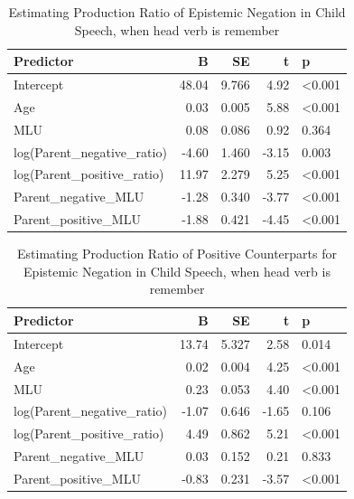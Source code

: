 \documentclass[
  english,
  man,floatsintext]{apa6}
\begin{document}
\begin{table}

\caption{\label{tab:unnamed-chunk-8}Estimating Production Ratio of Epistemic Negation in Child Speech, when head verb is remember}
\centering
\begin{tabular}[t]{l|r|r|r|l}
\hline
Predictor & B & SE & t & p\\
\hline
Intercept & 48.04 & 9.766 & 4.92 & <0.001\\
\hline
Age & 0.03 & 0.005 & 5.88 & <0.001\\
\hline
MLU & 0.08 & 0.086 & 0.92 & 0.364\\
\hline
log(Parent\_negative\_ratio) & -4.60 & 1.460 & -3.15 & 0.003\\
\hline
log(Parent\_positive\_ratio) & 11.97 & 2.279 & 5.25 & <0.001\\
\hline
Parent\_negative\_MLU & -1.28 & 0.340 & -3.77 & <0.001\\
\hline
Parent\_positive\_MLU & -1.88 & 0.421 & -4.45 & <0.001\\
\hline
\end{tabular}
\end{table}

\begin{table}

\caption{\label{tab:unnamed-chunk-8}Estimating Production Ratio of Positive Counterparts for Epistemic Negation in Child Speech, when head verb is remember}
\centering
\begin{tabular}[t]{l|r|r|r|l}
\hline
Predictor & B & SE & t & p\\
\hline
Intercept & 13.74 & 5.327 & 2.58 & 0.014\\
\hline
Age & 0.02 & 0.004 & 4.25 & <0.001\\
\hline
MLU & 0.23 & 0.053 & 4.40 & <0.001\\
\hline
log(Parent\_negative\_ratio) & -1.07 & 0.646 & -1.65 & 0.106\\
\hline
log(Parent\_positive\_ratio) & 4.49 & 0.862 & 5.21 & <0.001\\
\hline
Parent\_negative\_MLU & 0.03 & 0.152 & 0.21 & 0.833\\
\hline
Parent\_positive\_MLU & -0.83 & 0.231 & -3.57 & <0.001\\
\hline
\end{tabular}
\end{table}

\clearpage
\end{document}
